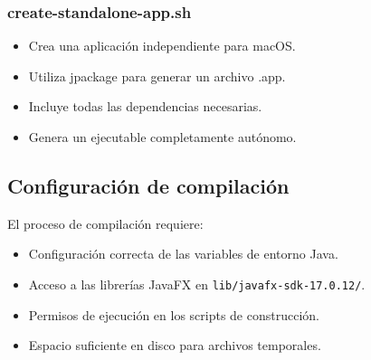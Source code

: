\subsubsection{create-standalone-app.sh}
\begin{itemize}
    \item Crea una aplicación independiente para macOS.
    \item Utiliza jpackage para generar un archivo .app.
    \item Incluye todas las dependencias necesarias.
    \item Genera un ejecutable completamente autónomo.
\end{itemize}

\subsection{Configuración de compilación}

El proceso de compilación requiere:

\begin{itemize}
    \item Configuración correcta de las variables de entorno Java.
    \item Acceso a las librerías JavaFX en \texttt{lib/javafx-sdk-17.0.12/}.
    \item Permisos de ejecución en los scripts de construcción.
    \item Espacio suficiente en disco para archivos temporales.
\end{itemize}

